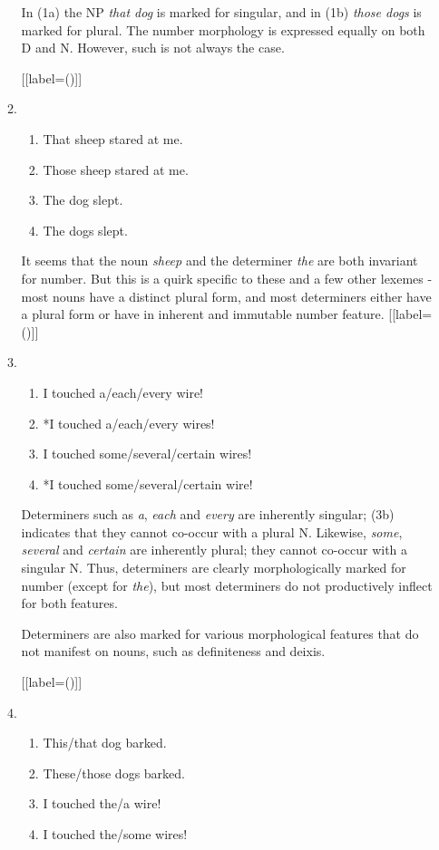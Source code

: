 \documentclass[12pt]{article}
\begin{document}
\begin{enumerate}[label=\textbf{\arabic*.}]
\begin{enumerate}[label=(\arabic*)]
In (1a) the NP \emph{that dog} is marked for singular, and in (1b) \emph{those dogs} is marked for plural. The number morphology is expressed equally on both D and N. However, such is not always the case.

[{[label=(\arabic*)]}]
\item
\begin{enumerate}[label=\alph*.]
\item That sheep stared at me.
\item Those sheep stared at me.
\item The dog slept.
\item The dogs slept.
\end{enumerate}
It seems that the noun \emph{sheep} and the determiner \emph{the} are both invariant for number. But this is a quirk specific to these and a few other lexemes - most nouns have a distinct plural form, and most determiners either have a plural form or have in inherent and immutable number feature.
[{[label=(\arabic*)]}]
\item
\begin{enumerate}[label=\alph*.]
\item I touched a/each/every wire!
\item *I touched a/each/every wires!
\item I touched some/several/certain wires!
\item *I touched some/several/certain wire!
\end{enumerate}

Determiners such as \emph{a}, \emph{each} and \emph{every} are inherently singular; (3b) indicates that they cannot co-occur with a plural N. Likewise, \emph{some}, \emph{several} and \emph{certain} are inherently plural; they cannot co-occur with a singular N. Thus, determiners are clearly morphologically marked for number (except for \emph{the}), but most determiners do not productively inflect for both features.

Determiners are also marked for various morphological features that do not manifest on nouns, such as definiteness and deixis.

[{[label=(\arabic*)]}]
\item
\begin{enumerate}[label=\alph*.]
\item This/that dog barked.
\item These/those dogs barked.
\item I touched the/a wire!
\item I touched the/some wires!
\end{enumerate}


\end{enumerate}
\end{enumerate}
\end{document}
